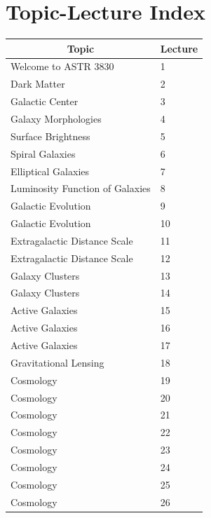 \documentclass{book}
\begin{document}
\chapter{Topic-Lecture Index}
\begin{table}[H]
    \centering
    \begin{tabular}{|ll|}
        \hline
        \multicolumn{1}{|c}{Topic}      & Lecture \\ \hline \hline
        Welcome to ASTR 3830            & 1       \\ \hline
        Dark Matter                     & 2       \\ \hline
        Galactic Center                 & 3       \\ \hline
        Galaxy Morphologies             & 4       \\ \hline
        Surface Brightness              & 5       \\ \hline
        Spiral Galaxies                 & 6       \\ \hline
        Elliptical Galaxies             & 7       \\ \hline
        Luminosity Function of Galaxies & 8       \\ \hline
        Galactic Evolution              & 9       \\ \hline
        Galactic Evolution              & 10      \\ \hline
        Extragalactic Distance Scale    & 11      \\ \hline
        Extragalactic Distance Scale    & 12      \\ \hline
        Galaxy Clusters                 & 13      \\ \hline
        Galaxy Clusters                 & 14      \\ \hline
        Active Galaxies                 & 15      \\ \hline
        Active Galaxies                 & 16      \\ \hline
        Active Galaxies                 & 17      \\ \hline
        Gravitational Lensing           & 18      \\ \hline
        Cosmology                       & 19      \\ \hline
        Cosmology                       & 20      \\ \hline
        Cosmology                       & 21      \\ \hline
        Cosmology                       & 22      \\ \hline
        Cosmology                       & 23      \\ \hline
        Cosmology                       & 24      \\ \hline
        Cosmology                       & 25      \\ \hline
        Cosmology                       & 26      \\ \hline
    \end{tabular}
\end{table}
\end{document}
